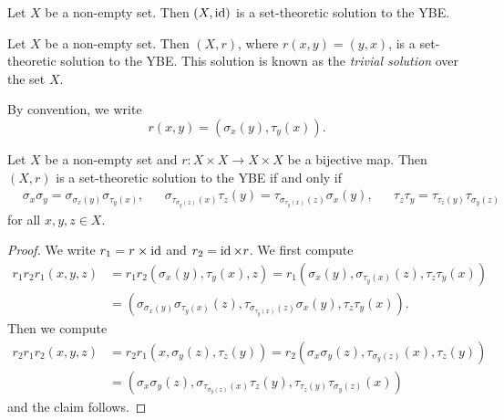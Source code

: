\begin{example}
Let $X$ be a non-empty set. Then $(X,\operatorname{id})$ is a set-theoretic 
solution to the YBE. 	
\end{example}

\begin{example}
Let $X$ be a non-empty set. Then $(X,r)$, where $r(x,y)=(y,x)$, is a  set-theoretic solution to the YBE. This solution 
is known as the \emph{trivial solution} over the set $X$. 
\end{example}

By convention, we write
\[
r(x,y)=(\sigma_x(y),\tau_y(x)).
\]

\begin{lemma}
    \label{lem:YB}
    Let $X$ be a non-empty set and $r\colon X\times X\to X\times X$ be a bijective map.
    Then $(X,r)$ is a set-theoretic solution to the YBE if and only if 
    \begin{align*}
        &\sigma_x\sigma_y = \sigma_{\sigma_x(y)}\sigma_{\tau_y(x)},&
        &\sigma_{\tau_{\sigma_y(z)}(x)}\tau_z(y)=\tau_{\sigma_{\tau_y(x)}(z)}\sigma_x(y),&
        &\tau_z\tau_y=\tau_{\tau_z(y)}\tau_{\sigma_y(z)}
    \end{align*}
    for all $x,y,z\in X$. 
\end{lemma}

\begin{proof}
    We write $r_1=r\times\operatorname{id}$ and $r_2=\operatorname{id}\times r$. We first compute
    \begin{align*}
        r_1r_2r_1(x,y,z)&=r_1r_2(\sigma_x(y),\tau_y(x),z)
        =r_1(\sigma_x(y),\sigma_{\tau_y(x)}(z),\tau_z\tau_y(x))\\
        &=\left(\sigma_{\sigma_x(y)}\sigma_{\tau_y(x)}(z),\tau_{\sigma_{\tau_y(x)}(z)}\sigma_x(y),\tau_z\tau_y(x)\right).
    \end{align*}
    Then we compute
    \begin{align*}
        r_2r_1r_2(x,y,z)&=r_2r_1(x,\sigma_y(z),\tau_z(y))
        =r_2(\sigma_x\sigma_y(z),\tau_{\sigma_y(z)}(x),\tau_z(y))\\
        &=\left(\sigma_x\sigma_y(z),\sigma_{\tau_{\sigma_y(z)}(x)}\tau_z(y),\tau_{\tau_z(y)}\tau_{\sigma_y(z)}(x)\right)
    \end{align*}
    and the claim follows.    
\end{proof}

